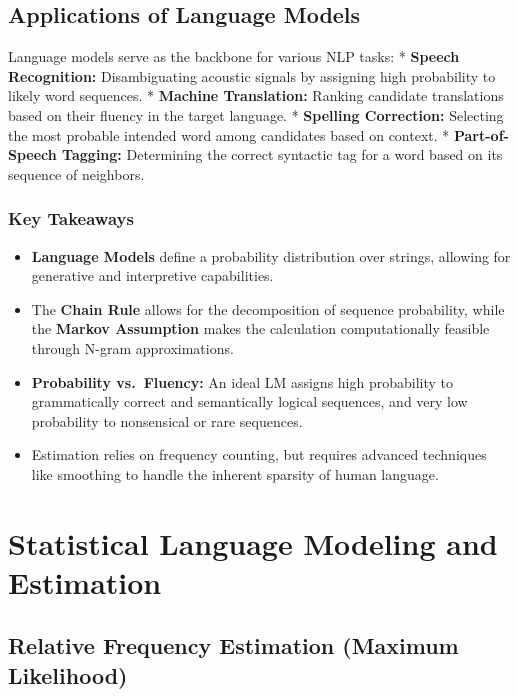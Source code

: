 \documentclass[
  italian,
  11pt,
]{article}
\providecommand{\tightlist}{%
  \setlength{\itemsep}{0pt}\setlength{\parskip}{0pt}}
\begin{document}
\subsection{Applications of Language
Models}\label{applications-of-language-models}

Language models serve as the backbone for various NLP tasks: *
\textbf{Speech Recognition:} Disambiguating acoustic signals by
assigning high probability to likely word sequences. * \textbf{Machine
Translation:} Ranking candidate translations based on their fluency in
the target language. * \textbf{Spelling Correction:} Selecting the most
probable intended word among candidates based on context. *
\textbf{Part-of-Speech Tagging:} Determining the correct syntactic tag
for a word based on its sequence of neighbors.

\subsubsection{Key Takeaways}\label{key-takeaways-6}

\begin{itemize}
\tightlist
\item
  \textbf{Language Models} define a probability distribution over
  strings, allowing for generative and interpretive capabilities.
\item
  The \textbf{Chain Rule} allows for the decomposition of sequence
  probability, while the \textbf{Markov Assumption} makes the
  calculation computationally feasible through N-gram approximations.
\item
  \textbf{Probability vs.~Fluency:} An ideal LM assigns high probability
  to grammatically correct and semantically logical sequences, and very
  low probability to nonsensical or rare sequences.
\item
  Estimation relies on frequency counting, but requires advanced
  techniques like smoothing to handle the inherent sparsity of human
  language.
\end{itemize}

\newpage

\section{Statistical Language Modeling and
Estimation}\label{statistical-language-modeling-and-estimation}

\subsection{Relative Frequency Estimation (Maximum
Likelihood)}\label{relative-frequency-estimation-maximum-likelihood}
\end{document}
